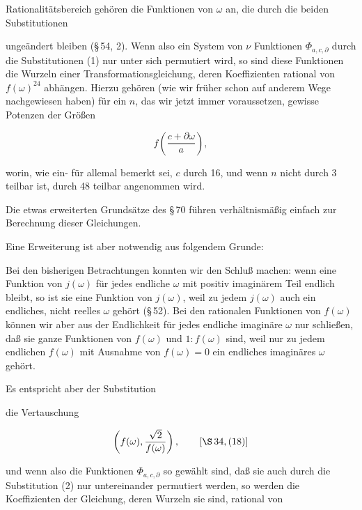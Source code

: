Rationalitätsbereich gehören die Funktionen von $\omega$ an, die durch
die beiden Substitutionen


ungeändert bleiben (\S\,54, 2). Wenn also ein System von $\nu$
Funktionen $\Phi_{a,c,\partial}$ durch die Substitutionen (1) nur unter sich
permutiert wird, so sind diese Funktionen die Wurzeln einer
Transformationsgleichung, deren Koeffizienten rational von
$f(\omega)^{24}$ abhängen. Hierzu gehören (wie wir früher schon auf anderem
Wege nachgewiesen haben) für ein  $n$, das wir jetzt
immer voraussetzen, gewisse Potenzen der Größen

\[
f\left(\frac{c+\partial\omega}{a}\right),
\]

worin, wie ein- für allemal bemerkt sei, $c$ durch 16, und wenn $n$
nicht durch 3 teilbar ist, durch 48 teilbar angenommen wird.

Die etwas erweiterten Grundsätze des \S\,70 führen verhältnismäßig
 einfach zur Berechnung dieser Gleichungen.

Eine Erweiterung ist aber notwendig aus folgendem Grunde:

Bei den bisherigen Betrachtungen konnten wir den Schluß
machen: wenn eine  Funktion von $j(\omega)$ für jedes endliche
 $\omega$ mit positiv imaginärem Teil endlich bleibt, so ist sie
eine  Funktion von $j(\omega)$, weil zu jedem  $j(\omega)$
auch ein endliches, nicht reelles $\omega$ gehört (\S\,52). Bei den rationalen
 Funktionen von $f(\omega)$ können wir aber aus der Endlichkeit
für jedes endliche imaginäre $\omega$ nur schließen, daß sie ganze
Funktionen von $f(\omega)$ und $1:f(\omega)$ sind, weil nur zu jedem endlichen
 $f(\omega)$ mit Ausnahme von $f(\omega) = 0$ ein endliches imaginäres
$\omega$ gehört.

Es entspricht aber der Substitution


die Vertauschung

\[
\left(f(\omega), \frac{\sqrt{2}}{f(\omega)}\right), \qquad [\S\,34, (18)]
\]

und wenn also die Funktionen $\Phi_{a,c,\partial}$ so gewählt sind, daß sie
auch durch die Substitution (2) nur untereinander permutiert
werden, so werden die Koeffizienten der Gleichung, deren Wurzeln
sie sind, rational von
